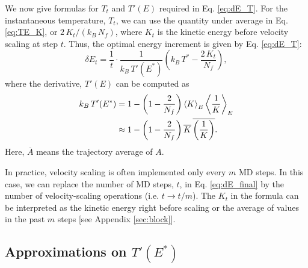 \documentclass[reprint]{revtex4-1}
\begin{document}
We now give formulas for $T_t$
and $T'(E)$ required in Eq. \eqref{eq:dE_T}.
%
%
For the instantaneous temperature, $T_t$,
we can use the quantity under average in Eq. \eqref{eq:TE_K},
or $2 \, K_t/(k_B \, N_f)$,
where
$K_t$ is the kinetic energy before velocity scaling at step $t$.
%
Thus, the optimal energy increment is given by
Eq. \eqref{eq:dE_T}:
%
\begin{equation}
\delta E_t
=
\frac{ 1 } { t } \cdot
\frac{ 1 } { k_B \, T'(E^*) }
\left(
 k_B \, T^*
 -
 \frac{ 2 \, K_t } { N_f }
\right)
,
\label{eq:dE_final}
\end{equation}
%
where the derivative, $T'(E)$
can be computed as\cite{cagin1988}
%
\begin{align}
  k_B \, T'(E^*)
  &=
  1
  -
  \left(
    1 - \frac{2}{N_f}
  \right)
  \left\langle
  K
  \right\rangle_E
  \left\langle
    \frac 1 K
  \right\rangle_E
  \notag
  \\
  &\approx
  1
  -
  \left(
    1 - \frac{ 2 } { N_f }
  \right)
  \overline{ K }
  \,
  \overline{ \left( \frac 1 K \right) }
  .
  \label{eq:dT}
\end{align}
%
Here,
$\overline A$ means the trajectory average of $A$.

In practice, velocity scaling is often implemented
only every $m$ MD steps.
%
In this case,
we can replace the number of MD steps, $t$,
in Eq. \eqref{eq:dE_final} by
the number of velocity-scaling operations
(i.e. $t \to t/m$).
%
The $K_t$ in the formula can be interpreted as
the kinetic energy right before scaling
or the average of values in the past $m$ steps
[see Appendix \ref{sec:block}].




\subsection{\label{sec:gamma}
Approximations on $T'(E^*)$}
\end{document}

